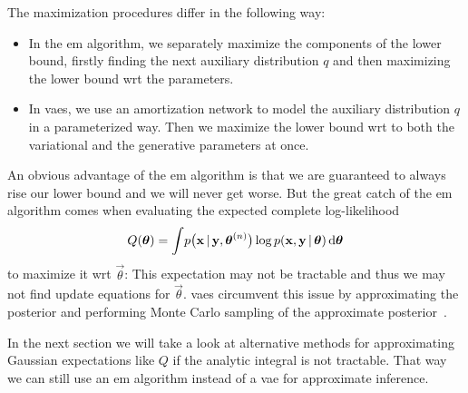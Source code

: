 			The maximization procedures differ in the following way:
			\begin{itemize}
				\item In the \ac{em} algorithm, we separately maximize the components of the lower bound, firstly finding the next auxiliary distribution \(q\) and then maximizing the lower bound \ac{wrt} the parameters.
				\item In \acp{vae}, we use an amortization network to model the auxiliary distribution \(q\) in a parameterized way. Then we maximize the lower bound \ac{wrt} to both the variational and the generative parameters at once.
			\end{itemize}
			An obvious advantage of the \ac{em} algorithm is that we are guaranteed to always rise our lower bound and we will never get worse. But the great catch of the \ac{em} algorithm comes when evaluating the expected complete log-likelihood
			\begin{align*}
				Q(\boldsymbol{\mathrm{\theta}}) = \int\! p\big(\boldsymbol{\mathrm{x}} \,\vert\, \boldsymbol{\mathrm{y}}, \boldsymbol{\mathrm{\theta}}^{(n)}\big) \log p(\boldsymbol{\mathrm{x}}, \boldsymbol{\mathrm{y}} \,\vert\, \boldsymbol{\mathrm{\theta}}) \dd{\boldsymbol{\mathrm{\theta}}}
			\end{align*}
			to maximize it \ac{wrt} \(\vec{\theta}\): This expectation may not be tractable and thus we may not find update equations for \(\vec{\theta}\). \acp{vae} circumvent this issue by approximating the posterior and performing Monte Carlo sampling of the approximate posterior~\cite{kingmaAutoEncodingVariationalBayes2014}.


			In the next section we will take a look at alternative methods for approximating Gaussian expectations like \(Q\) if the analytic integral is not tractable. That way we can still use an \ac{em} algorithm instead of a \ac{vae} for approximate inference.
